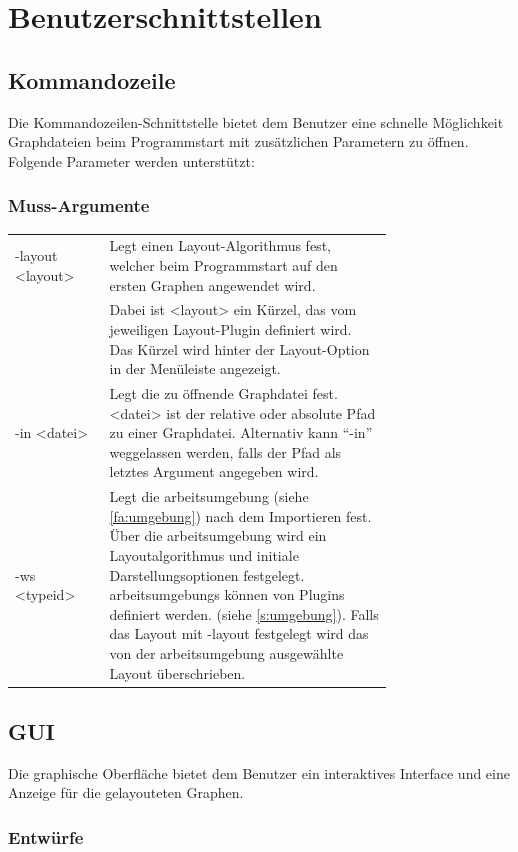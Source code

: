 \chapter{Benutzerschnittstellen}

\section{Kommandozeile}\label{sec:uicmd}

Die Kommandozeilen-Schnittstelle bietet dem Benutzer eine schnelle Möglichkeit Graphdateien beim Programmstart mit zusätzlichen Parametern zu öffnen.
Folgende Parameter werden unterstützt:\\
\subsection{Muss-Argumente}
\begin{tabular}{lp{0.75\linewidth}}
  -layout <layout> & Legt einen Layout-Algorithmus fest, welcher beim Programmstart auf den ersten Graphen angewendet wird.\\
    & Dabei ist <layout> ein Kürzel, das vom jeweiligen Layout-Plugin definiert wird. Das Kürzel wird hinter der Layout-Option in der Menüleiste angezeigt.\\
  -in <datei> & Legt die zu öffnende Graphdatei fest. <datei> ist der relative oder absolute Pfad zu einer Graphdatei. Alternativ kann ``-in'' weggelassen werden, falls der Pfad als letztes Argument angegeben wird.\\
  -ws <typeid> & Legt die \gls{arbeitsumgebung} (siehe \ref{fa:umgebung}) nach dem Importieren fest. Über die \gls{arbeitsumgebung} wird ein Layoutalgorithmus und initiale Darstellungsoptionen festgelegt. \glspl{arbeitsumgebung} können von Plugins definiert werden. (siehe \ref{s:umgebung}). Falls das Layout mit -layout festgelegt wird das von der \gls{arbeitsumgebung} ausgewählte Layout überschrieben.
\end{tabular}


\section{GUI}\label{sec:uigui}

Die graphische Oberfläche bietet dem Benutzer ein interaktives Interface und eine Anzeige für die gelayouteten Graphen.

\subsection{Entwürfe}


